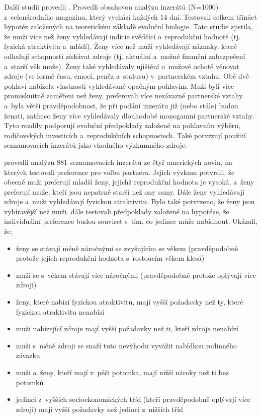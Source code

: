 \documentclass[a4paper, 12pt, notitlepage, oneside, numbers=noenddot]{report}
\begin{document}
Další studii provedli \citet{GreenlessMcGrew1994}. Provedli obsahovou
analýzu inzerátů (N=1000) z~celonárodního magazínu, který vychází
každých 14 dní. Testovali celkem třináct hypotéz založených na
teoretickém základě evoluční biologie. Tato studie zjistila, že muži
více než ženy vyhledávají indície svědčící o~reprodukční hodnotě
(tj. fyzická atraktivita a~mládí). Ženy více než muži vyhledávají
náznaky, které odhalují schopnosti získávat zdroje (tj. aktuální
a~možné finanční zabezpečení a~starší věk muže). Ženy také vyhledávaly
ujištění o~mužově ochotě věnovat zdroje (ve formě času, emocí, peněz
a~statusu) v~partnerském vztahu. Obě dvě pohlaví nabízela vlastnosti
vyhledávané opačným pohlavím. Muži byli více promiskuitně zaměřeni než
ženy, preferovali více nezávazné partnerské vztahy a~byla větší
pravděpodobnost, že při podání inzerátu již (nebo stále) budou ženatí,
zatímco ženy více vyhledávaly dlouhodobé monogamní partnerské
vztahy. Tyto rozdíly podporují evoluční předpoklady založené na
pohlavním výběru, rodičovských investicích a~reprodukčních
schopnostech. Také potvrzují použití seznamovacích inzerátů jako
vhodného výzkumného zdroje.

\citet{WayfordDunbar1995} provedli analýzu 881 seznamovacích inzerátů
ze čtyř ame\-ric\-kých novin, na kterých testovali preference pro volbu
partnera. Jejich výzkum potvrdil, že obecně muži preferují mladší
ženy, jejichž reprodukční hodnota je vysoká, a~ženy preferují muže,
kteří jsou nepatrně starší než ony samy. Dále ženy vyhledávají zdroje
a~muži vyhledávají fyzickou atraktivitu. Bylo také potvrzeno, že ženy
jsou vybíravější než muži. \citet{WayfordDunbar1995} dále testovali
předpoklady založené na hypotéze, že individuální preference budou
souviset s~tím, co jedinec může nabídnout. Ukázali, že:

\begin{itemize}
\item ženy se stávají méně náročnými se zvyšujícím se věkem
  (pravděpodobně protože jejich reprodukční hodnota s~rostoucím věkem
  klesá)
\item muži se s~věkem stávají více náročnými (pravděpodobně protože
  oplývají více zdroji)
\item ženy, které nabízí fyzickou atraktivitu, mají vyšší požadavky než
  ty, které fyzickou atraktivitu nenabízí
\item muži nabízející zdroje mají vyšší požadavky než ti, kteří zdroje
  nenabízí
\item muži s~méně zdroji se snaží tuto nevýhodu vyvážit nabídkou
  rodinného závazku
\item muži a~ženy, kteří mají v~péči potomka, mají nižší nároky než ti
  bez potomků
\item jedinci z~vyšších socioekonomických tříd (kteří pravděpodobně
  oplývají více zdroji) mají vyšší požadavky než jedinci z~nižších
  tříd
\end{itemize}
\end{document}
